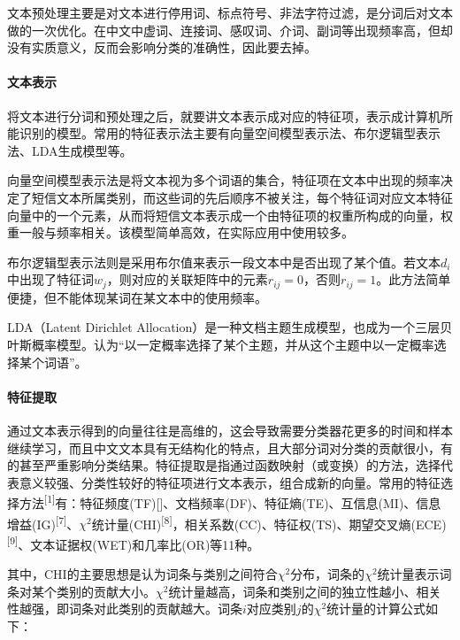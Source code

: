 文本预处理主要是对文本进行停用词、标点符号、非法字符过滤，是分词后对文本做的一次优化。在中文中虚词、连接词、感叹词、介词、副词等出现频率高，但却没有实质意义，反而会影响分类的准确性，因此要去掉。

\paragraph{文本表示}\label{ux6587ux672cux8868ux793a}

将文本进行分词和预处理之后，就要讲文本表示成对应的特征项，表示成计算机所能识别的模型。常用的特征表示法主要有向量空间模型表示法、布尔逻辑型表示法、LDA生成模型等。

向量空间模型表示法是将文本视为多个词语的集合，特征项在文本中出现的频率决定了短信文本所属类别，而这些词的先后顺序不被关注，每个特征词对应文本特征向量中的一个元素，从而将短信文本表示成一个由特征项的权重所构成的向量，权重一般与频率相关。该模型简单高效，在实际应用中使用较多。

布尔逻辑型表示法则是采用布尔值来表示一段文本中是否出现了某个值。若文本\(d_i\)中出现了特征词\(w_j\)，则对应的关联矩阵中的元素\(r_{ij}=0\)，否则\(r_{ij}=1\)。此方法简单便捷，但不能体现某词在某文本中的使用频率。

LDA（Latent Dirichlet
Allocation）是一种文档主题生成模型，也成为一个三层贝叶斯概率模型。认为``以一定概率选择了某个主题，并从这个主题中以一定概率选择某个词语''。

\paragraph{特征提取}\label{ux7279ux5f81ux63d0ux53d6}

通过文本表示得到的向量往往是高维的，这会导致需要分类器花更多的时间和样本继续学习，而且中文文本具有无结构化的特点，且大部分词对分类的贡献很小，有的甚至严重影响分类结果。特征提取是指通过函数映射（或变换）的方法，选择代表意义较强、分类性较好的特征项进行文本表示，组合成新的向量。常用的特征选择方法\textsuperscript{{[}1{]}}有：特征频度(TF){[}{]}、文档频率(DF)、特征熵(TE)、互信息(MI)、信息增益(IG)\textsuperscript{{[}7{]}}、\(\chi^2\)统计量(CHI)\textsuperscript{{[}8{]}}，相关系数(CC)、特征权(TS)、期望交叉熵(ECE)\textsuperscript{{[}9{]}}、文本证据权(WET)和几率比(OR)等11种。

其中，CHI的主要思想是认为词条与类别之间符合\(\chi^2\)分布，词条的\(\chi^2\)统计量表示词条对某个类别的贡献大小。\(\chi^2\)统计量越高，词条和类别之间的独立性越小、相关性越强，即词条对此类别的贡献越大。词条\(i\)对应类别\(j\)的\(\chi^2\)统计量的计算公式如下：

